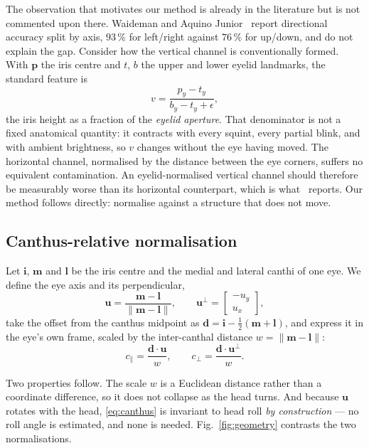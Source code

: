 \documentclass[conference]{IEEEtran}
\begin{document}
The observation that motivates our method is already in the literature but is
not commented upon there. Waideman and Aquino Junior~\cite{ref01} report
directional accuracy split by axis, $93\,\%$ for left/right against $76\,\%$ for
up/down, and do not explain the gap. Consider how the vertical channel is
conventionally formed. With $\mathbf{p}$ the iris centre and $t$, $b$ the upper
and lower eyelid landmarks, the standard feature is
\begin{equation}
v = \frac{p_y - t_y}{b_y - t_y + \epsilon},
\label{eq:eyelid}
\end{equation}
the iris height as a fraction of the \emph{eyelid aperture}. That denominator is
not a fixed anatomical quantity: it contracts with every squint, every partial
blink, and with ambient brightness, so $v$ changes without the eye having moved.
The horizontal channel, normalised by the distance between the eye corners,
suffers no equivalent contamination. An eyelid-normalised vertical channel
should therefore be measurably worse than its horizontal counterpart, which is
what~\cite{ref01} reports. Our method follows directly: normalise against a
structure that does not move.

\subsection{Canthus-relative normalisation}

Let $\mathbf{i}$, $\mathbf{m}$ and $\mathbf{l}$ be the iris centre and the
medial and lateral canthi of one eye. We define the eye axis and its
perpendicular,
\begin{equation}
\mathbf{u} = \frac{\mathbf{m} - \mathbf{l}}{\lVert \mathbf{m} - \mathbf{l}\rVert},
\qquad
\mathbf{u}^{\perp} = \begin{bmatrix} -u_y \\ u_x \end{bmatrix},
\end{equation}
take the offset from the canthus midpoint as
$\mathbf{d} = \mathbf{i} - \tfrac{1}{2}(\mathbf{m} + \mathbf{l})$, and express
it in the eye's own frame, scaled by the inter-canthal distance
$w = \lVert \mathbf{m} - \mathbf{l}\rVert$:
\begin{equation}
c_{\parallel} = \frac{\mathbf{d}\cdot\mathbf{u}}{w},
\qquad
c_{\perp} = \frac{\mathbf{d}\cdot\mathbf{u}^{\perp}}{w}.
\label{eq:canthus}
\end{equation}

Two properties follow. The scale $w$ is a Euclidean distance rather than a
coordinate difference, so it does not collapse as the head turns. And because
$\mathbf{u}$ rotates with the head, \eqref{eq:canthus} is invariant to head roll
\emph{by construction} --- no roll angle is estimated, and none is needed.
Fig.~\ref{fig:geometry} contrasts the two normalisations.
\end{document}

